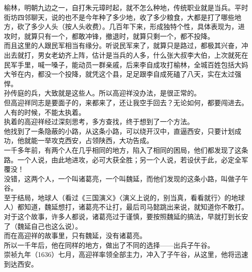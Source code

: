 \begin{multicols}{\theparacolNo}
榆林，明朝九边之一，自打朱元璋时起，就不怎么种地，传统职业就是当兵。平时街坊四邻聊天，说的也不是今年种了多少地，收了多少粮食，大都是打了哪些地方，砍了多少人头（按人头收费）。几百年下来，形成独特个性，具体表现为，进攻时，就算只有一个，都敢冲锋，撤退时，就算只剩一个，都不投降。\\

而且这里的人跟民军相当有缘分。听说民军来了，就算只是路过，都极其兴奋，冲出去就打，男女老幼齐上阵，估计是当兵的人多，什么张大叔李大伯，上次就死在民军手里，喊一嗓子，能动员一群亲戚，后来李自成攻打榆林，全城百姓包括大妈大爷在内，都没一个投降，就凭这个县，足足跟李自成死磕了八天，实在太过强悍。\\

孙传庭的兵，大致就是这些人。所以高迎祥没办法，是很正常的。\\

但高迎祥同志是要面子的，来都来了，还让我空手回去？无论如何，都要闯进去。\\

人有的时候，不能太执着。\\

执着的高迎祥经过深刻思考，多方查找，终于想到了一个方法。\\

他找到了一条隐蔽的小路，从这条小路，可以绕开汉中，直逼西安，只要计划成功，他就能一举攻克西安，占领陕西，大功告成。\\

一千多年前，有两个人在几乎相同的地方，陷入了相同的困局，他们都发现了这条路。一个人说，由此地进攻，必可大获全胜；另一个人说，若设伏于此，必定全军覆没！\\

没错，这两个人，一个叫诸葛亮，一个叫魏延，而他们发现的这条小路，叫做子午谷。\\

至于结局，地球人（看过《三国演义》〈演义上说的，别当真，看看就行〉的地球人）都知道，魏延想打，诸葛亮不让打，最后司马懿跳出来说，就知道你不敢打。\\

对于这个故事，许多人都说，诸葛亮过于谨慎，要按照魏延的搞法，早就打到长安了（魏延自己也这么说）。\\

而在高迎祥的故事里，只有魏延，没有诸葛亮。\\

所以一千年后，他在同样的地方，做出了不同的选择——出兵子午谷。\\

崇祯九年（1636）七月，高迎祥率领全部主力，冲入了子午谷，从这里，他将迅速到达西安。\\


\end{multicols}
